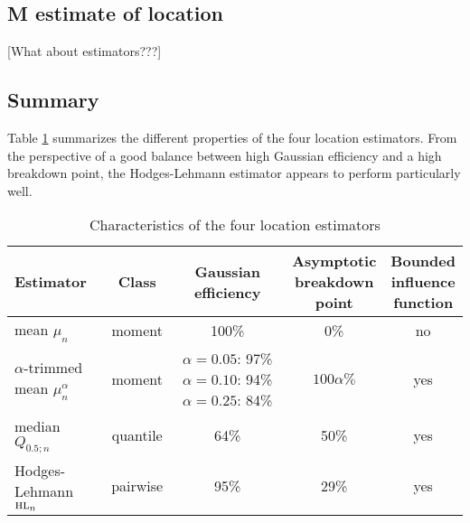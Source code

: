
\subsection{M estimate of location}

\alert{[What about  estimators???]}

\subsection{Summary}


Table \ref{tab:stat:location} summarizes the different properties of the four
location estimators. From the perspective of a good balance between high
Gaussian efficiency and a high breakdown point, the Hodges-Lehmann estimator
appears to perform particularly well.

\begin{table}[h!]
    \centering
    \caption{Characteristics of the four location estimators}
    \label{tab:stat:location}
    \begin{tabular}{lcccc}
        \toprule
        Estimator
        & Class  
        & \subtab{c}{Gaussian\\ efficiency}
        & \subtab{c}{Asymptotic\\ breakdown\\ point} 
        & \subtab{c}{Bounded\\ influence\\ function}
        \\\midrule
        mean $\mu_n$                            & moment   & 100\% &  0\%          & no
        \\\addlinespace
        $\alpha$-trimmed mean $\mu_n^{\alpha}$  & moment   & 
            \subtab{l}{$\alpha=0.05$: 97\%\\ $\alpha=0.10$: 94\%\\ $\alpha=0.25$: 84\%} 
                                                                   & $100\alpha\%$ & yes
        \\\addlinespace
        median $Q_{0.5;n}$                      & quantile & 64\%  & 50\%          & yes
        \\\addlinespace
        Hodges-Lehmann $\stsc{HL}_n$            & pairwise & 95\%  & 29\%          & yes
        \\\bottomrule
    \end{tabular}
\end{table}


